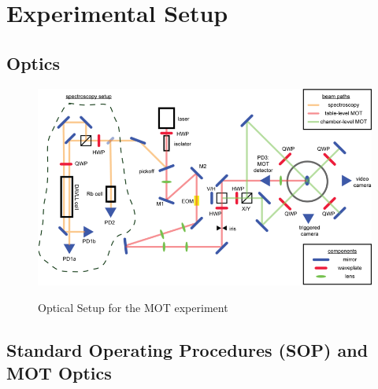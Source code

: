 \documentclass{../lab}
\begin{document}
\section{Experimental Setup}

\subsection{Optics}

\begin{figure}[h]
    \centering
    \href{http://experimentationlab.berkeley.edu/sites/default/files/images/800px-Setupv7.png}{\includegraphics[width=0.6\linewidth]{images/800px-Setupv7.png}}
    \caption{Optical Setup for the MOT experiment}
    \label{fig:OpticalSetup}
\end{figure}

\subsection{Standard Operating Procedures (SOP) and MOT Optics}
\end{document}
